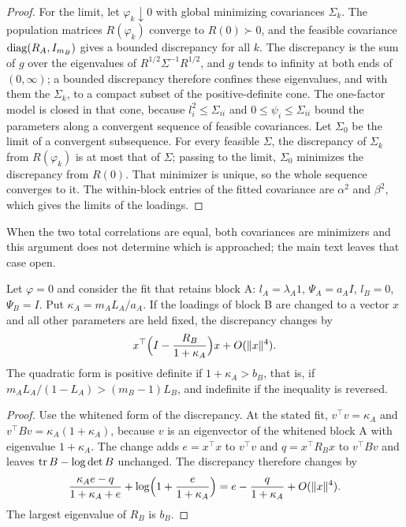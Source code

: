 \begin{proof}
For the limit, let $\varphi_k\downarrow0$ with global minimizing covariances $\Sigma_k$. The population matrices $R(\varphi_k)$ converge to $R(0)\succ0$, and the feasible covariance $\operatorname{diag}(R_A,I_{m_B})$ gives a bounded discrepancy for all $k$. The discrepancy is the sum of $g$ over the eigenvalues of $R^{1/2}\Sigma^{-1}R^{1/2}$, and $g$ tends to infinity at both ends of $(0,\infty)$; a bounded discrepancy therefore confines these eigenvalues, and with them the $\Sigma_k$, to a compact subset of the positive-definite cone. The one-factor model is closed in that cone, because $l_i^2\le\Sigma_{ii}$ and $0\le\psi_i\le\Sigma_{ii}$ bound the parameters along a convergent sequence of feasible covariances. Let $\Sigma_0$ be the limit of a convergent subsequence. For every feasible $\Sigma$, the discrepancy of $\Sigma_k$ from $R(\varphi_k)$ is at most that of $\Sigma$; passing to the limit, $\Sigma_0$ minimizes the discrepancy from $R(0)$. That minimizer is unique, so the whole sequence converges to it. The within-block entries of the fitted covariance are $\alpha^2$ and $\beta^2$, which gives the limits of the loadings.
\end{proof}

When the two total correlations are equal, both covariances are minimizers and this argument does not determine which is approached; the main text leaves that case open.

\begin{applemma}
\label{lem:D-curvature}
Let $\varphi=0$ and consider the fit that retains block A: $l_A=\lambda_A1$, $\Psi_A=a_AI$, $l_B=0$, $\Psi_B=I$. Put $\kappa_A=m_AL_A/a_A$. If the loadings of block B are changed to a vector $x$ and all other parameters are held fixed, the discrepancy changes by
\[
x^{\top}\Bigl(I-\frac{R_B}{1+\kappa_A}\Bigr)x+O(\|x\|^4).
\]
The quadratic form is positive definite if $1+\kappa_A>b_B$, that is, if $m_AL_A/(1-L_A)>(m_B-1)L_B$, and indefinite if the inequality is reversed.
\end{applemma}

\begin{proof}
Use the whitened form of the discrepancy. At the stated fit, $v^{\top}v=\kappa_A$ and $v^{\top}Bv=\kappa_A(1+\kappa_A)$, because $v$ is an eigenvector of the whitened block A with eigenvalue $1+\kappa_A$. The change adds $e=x^{\top}x$ to $v^{\top}v$ and $q=x^{\top}R_Bx$ to $v^{\top}Bv$ and leaves $\operatorname{tr} B-\log\det B$ unchanged. The discrepancy therefore changes by
\[
\frac{\kappa_Ae-q}{1+\kappa_A+e}+\log\Bigl(1+\frac e{1+\kappa_A}\Bigr)
=e-\frac q{1+\kappa_A}+O(\|x\|^4).
\]
The largest eigenvalue of $R_B$ is $b_B$.
\end{proof}

